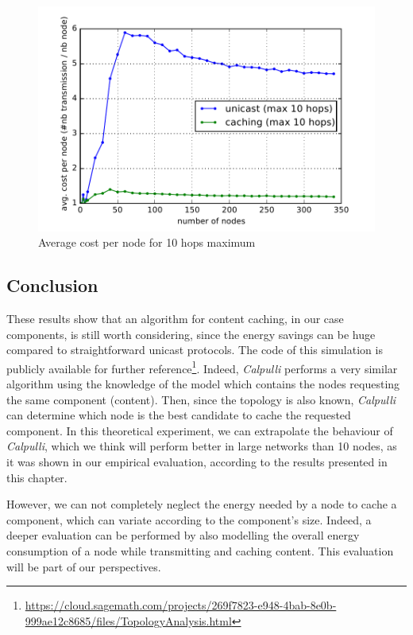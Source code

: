 \begin{figure}[]
	\centering
	\includegraphics[width=0.8 \columnwidth]{chapters/calpulli.images/avg-cost-per-node-10.pdf}
	\caption{Average cost per node for 10 hops maximum} \label{fig:AvgCostPerNode10hops}
\end{figure}

\subsection{Conclusion}
These results show that an algorithm for content caching, in our case components, is still worth considering, since the energy savings can be huge compared to straightforward unicast protocols.
The code of this simulation is publicly available for further reference\footnote{\url{https://cloud.sagemath.com/projects/269f7823-e948-4bab-8e0b-999ae12c8685/files/TopologyAnalysis.html}}.
Indeed, \textit{Calpulli} performs a very similar algorithm using the knowledge of the model which contains the nodes requesting the same component (content).
Then, since the topology is also known, \textit{Calpulli} can determine which node is the best candidate to cache the requested component.
In this theoretical experiment, we can extrapolate the behaviour of \textit{Calpulli}, which we think will perform better in large networks than 10 nodes, as it was shown in our empirical evaluation, according to the results presented in this chapter.

However, we can not completely neglect the energy needed by a node to cache a component, which can variate according to the component's size.
Indeed, a deeper evaluation can be performed by also modelling the overall energy consumption of a node while transmitting and caching content.
This evaluation will be part of our perspectives.

